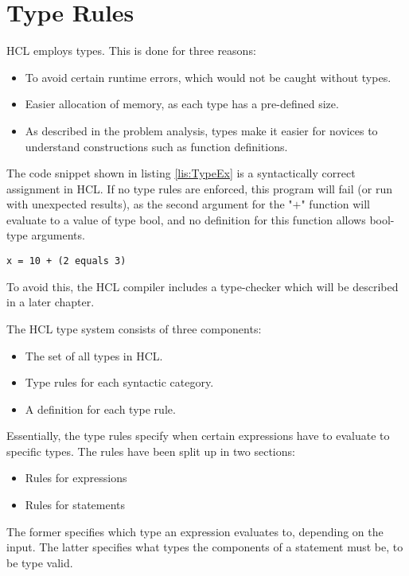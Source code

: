 \section{Type Rules}
\label{typerules}
HCL employs types.
This is done for three reasons:
\begin{itemize}
	\item To avoid certain runtime errors, which would not be caught without types.
	\item Easier allocation of memory, as each type has a pre-defined size.
	\item As described in the problem analysis, types make it easier for novices to understand constructions such as function definitions.
\end{itemize}
The code snippet shown in listing \ref{lis:TypeEx} is a syntactically correct assignment in HCL.
If no type rules are enforced, this program will fail (or run with unexpected results), as the second argument for the "$+$" function will evaluate to a value of type bool, and no definition for this function allows bool-type arguments.

\begin{lstlisting}[language=HCL,label=lis:TypeEx,caption=An HCL expression,firstnumber=1]
x = 10 + (2 equals 3)
\end{lstlisting}

To avoid this, the HCL compiler includes a type-checker which will be described in a later chapter.

The HCL type system consists of three components:
\begin{itemize}
	\item The set of all types in HCL.
	\item Type rules for each syntactic category.
	\item A definition for each type rule.
\end{itemize}

Essentially, the type rules specify when certain expressions have to evaluate to specific types.
The rules have been split up in two sections:
\begin{itemize}
	\item Rules for expressions
	\item Rules for statements
\end{itemize}
The former specifies which type an expression evaluates to, depending on the input.
The latter specifies what types the components of a statement must be, to be type valid.

